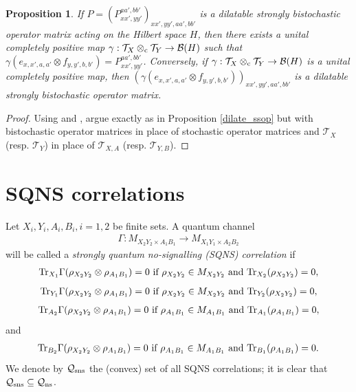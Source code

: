 \documentclass[11pt]{amsart}
\newtheorem{proposition}[theorem]{Proposition}
\newcommand{\cl}[1]{\mathcal{#1}}
\begin{document}
\begin{proposition}\label{dilate_bissop}
If $P = (P_{xx', yy'}^{aa', bb'})_{xx', yy', aa', bb'}$ is a dilatable strongly bistochastic operator matrix acting on the Hilbert space $H$, then there exists a unital completely positive map $\gamma: \cl{T}_{X}\otimes_{\rm c} \cl{T}_{Y}\rightarrow \cl{B}(H)$ such that $\gamma(e_{x, x', a, a'}\otimes f_{y, y', b, b'}) = P_{xx', yy'}^{aa', bb'}$. Conversely, if $\gamma: \cl{T}_{X}\otimes_{\rm c} \cl{T}_{Y}\rightarrow \cl{B}(H)$ is a unital completely positive map, then $(\gamma(e_{x, x', a, a'}\otimes f_{y, y', b, b'}))_{xx', yy', aa', bb'}$ is a dilatable strongly bistochastic operator matrix.
\end{proposition}
\begin{proof}
Using \cite[Theorem 3.4]{bhtt} and \cite[Theorem 6.4]{kptt}, argue exactly as in Proposition \ref{dilate_ssop} but with bistochastic operator matrices in place of stochastic operator matrices and $\cl{T}_{X}$ (resp. $\cl{T}_{Y}$) in place of $\cl{T}_{X, A}$ (resp. $\cl{T}_{Y, B}$).
\end{proof}




\section{SQNS correlations}\label{sqns_correlations_section}

Let $X_{i}, Y_{i}, A_{i}, B_{i}, i = 1, 2$ be finite sets. A quantum channel 
\begin{gather*}
	\Gamma: M_{X_{2}Y_{2}\times A_{1}B_{1}}\rightarrow M_{X_{1}Y_{1}\times A_{2}B_{2}}
\end{gather*}
\noindent will be called a \textit{strongly quantum no-signalling (SQNS) correlation} if
\begin{gather}\label{pt_one}
{\rm Tr}_{X_{1}}\Gamma(\rho_{X_{2}Y_{2}}\otimes \rho_{A_{1}B_{1}}) = 0 \text{ if } \rho_{X_{2}Y_{2}} \in M_{X_{2}Y_{2}} \text{ and } {\rm Tr}_{X_{2}}(\rho_{X_{2}Y_{2}}) = 0,
\end{gather}
\begin{gather}\label{pt_two}
{\rm Tr}_{Y_{1}}\Gamma(\rho_{X_{2}Y_{2}}\otimes \rho_{A_{1}B_{1}}) = 0 \text{ if } \rho_{X_{2}Y_{2}} \in M_{X_{2}Y_{2}} \text{ and } {\rm Tr}_{Y_{2}}(\rho_{X_{2}Y_{2}}) = 0,
\end{gather}
\begin{gather}\label{pt_three}
{\rm Tr}_{A_{2}}\Gamma(\rho_{X_{2}Y_{2}}\otimes \rho_{A_{1}B_{1}}) = 0 \text{ if } \rho_{A_{1}B_{1}} \in M_{A_{1}B_{1}} \text{ and } {\rm Tr}_{A_{1}}(\rho_{A_{1}B_{1}}) = 0,
\end{gather}
\noindent and
\begin{gather}\label{pt_four}
{\rm Tr}_{B_{2}}\Gamma(\rho_{X_{2}Y_{2}}\otimes \rho_{A_{1}B_{1}}) = 0 \text{ if } \rho_{A_{1}B_{1}} \in M_{A_{1}B_{1}} \text{ and } {\rm Tr}_{B_{1}}(\rho_{A_{1}B_{1}}) = 0.
\end{gather}
We denote by $\cl{Q}_{\rm sns}$ the (convex) set of all SQNS correlations; it is clear that $\cl{Q}_{\rm sns} \subseteq \cl{Q}_{\rm ns}$. 
\end{document}
